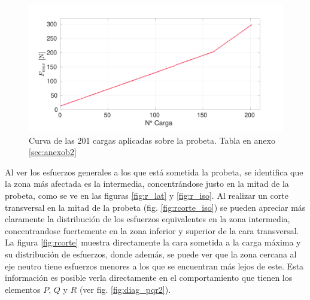 \begin{figure}[h]
\centering
\includegraphics[width=1\linewidth, trim={1cm 0cm 1cm 0cm}, clip]{Imagenes/fmax_step.pdf}
\caption{Curva de las 201 cargas aplicadas sobre la probeta. Tabla en anexo \ref{sec:anexob2}}
\label{fig:fmax_step}
\end{figure}

Al ver los esfuerzos generales a los que está sometida la probeta, se identifica que la zona más afectada es la intermedia, concentrándose justo en la mitad de la probeta, como se ve en las figuras \ref{fig:r_lat} y \ref{fig:r_iso}. Al realizar un corte transversal en la mitad de la probeta (fig. \ref{fig:rcorte_iso}) se pueden apreciar más claramente la distribución de los esfuerzos equivalentes en la zona intermedia, concentrandose fuertemente en la zona inferior y superior de la cara transversal. La figura \ref{fig:rcorte} muestra directamente la cara sometida a la carga máxima y su distribución de esfuerzos, donde además, se puede ver que la zona cercana al eje neutro tiene esfuerzos menores a los que se encuentran más lejos de este. Esta información es posible verla directamente en el comportamiento que tienen los elementos  $P$, $Q$ y $R$ (ver fig. \ref{fig:diag_pqr2}).


